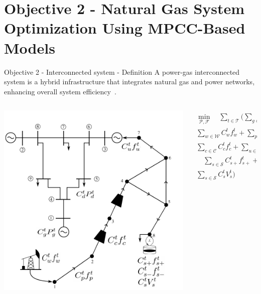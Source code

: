 \documentclass[hyperref={colorlinks,citecolor=blue,linkcolor=blue,urlcolor=blue}]{beamer}
\begin{document}
\section{Objective 2 - Natural Gas System Optimization Using MPCC-Based Models}
\justifying
\begin{frame}{Objective 2 - Interconnected system - Definition}
A power-gas interconnected system is a hybrid infrastructure that integrates natural gas and power networks, enhancing overall system efficiency~\cite{Duan_Liu_Yang_2022}. 
\begin{columns}
\begin{column}{0.5\textwidth}
   \begin{center}
     \includegraphics[width=1\textwidth]{figures/network_math_alternative.pdf}
     \end{center}
\end{column}
\begin{column}{0.5\textwidth}  
\begin{equation} \label{eq:obj_func_integrated}
\begin{split}
 \min_{\mathcal{P}, \mathcal{F}} \quad  \sum_{t \in \mathcal{T}} (   \sum_{g \in \mathcal{G}} C_{g}^t {P_{g}^t} + \sum_{d \in \mathcal{D}} C_{d}^t {P_{d}^t} +  \\ \sum_{w \in \mathcal{W}} C_{w}^t {f_{w}^t} +  \sum_{p \in \mathcal{P}} C_{p}^t {f_{p}^t}  + \\ \sum_{c \in \mathcal{C}} C_{c}^t {f_{c}^t} + \sum_{u \in \mathcal{U}} C_{u}^{t} {f_{u}^{t}} + \\ \quad \sum_{s \in \mathcal{S}} C_{s+}^{t} {f_{s+}^{t}}  + \sum_{s \in \mathcal{S}} C_{s-}^{t} {f_{s-}^{t}} + \\ \sum_{s \in \mathcal{S}} C_{s}^{t} {V_{s}^{t}} )
\end{split}
\end{equation} 
\end{column}
\end{columns}
\end{frame}
\end{document}
